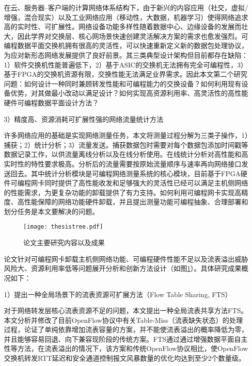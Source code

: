 在云、服务器--客户端的计算网络体系结构下，由于新兴的内容应用（社交，虚拟/增强，混合现实）以及工业网络应用（移动性，大数据，机器学习）使得网络追求高的实时性、可扩展性。网络设备功能多样性随着数据中心、边缘设备的发展而壮大，因此学界对交换层、核心网场景快速创建灵活解决方案的需求也愈发强烈。可编程数据平面交换机拥有很高的灵活性，可以快速重新定义新的数据包处理协议，为应对新形态网络发展提供了良好前景。其三类典型设计架构但目前都存在缺陷：1）软件交换机性能普遍低下，2）基于ASIC的交换机无法拥有完全可编程性，3）基于FPGA的交换机资源有限，交换性能无法满足业界需求。因此本文第二个研究问题：如何设计一种同时兼顾转发性能和可编程能力的交换设备？如何利用现有设备优势，对其做最小改动以满足设计？如何实现高资源利用率、高灵活性的高性能硬件可编程数据平面设计方法？

3）精度高、资源消耗可扩展性强的网络流量统计方法

许多网络应用的基础是实现网络测量任务，本文将测量过程分解为三类子操作，1）捕获；2）统计分析；3）流量发送。捕获数据包时需要对每个数据包添加时间戳等数据记录工作，以供流量离线分析以及在线分析使用。在线统计分析对高性能和高实时性的特性要求极高。分析后的流量需要按原始流量顺序与速率再向网络接口发送回去。其中统计分析模块是可编程网络测量系统的核心模块，目前基于FPGA硬件可编程网卡同时提供了高性能收发和足够强大的灵活性已经可以满足主机侧网络的性能需求，为更复杂功能的卸载提供了有力支持。如何利用可编程网卡实现高精度、高性能保障的网络功能硬件卸载，并且提出测量功能可编程抽象、合理部署和划分任务是本文要解决的问题。








\label{chap14}
\begin{figure}[!ht]
	\centering 
	\vspace{-1.5mm}
	\texttt{[image: thesistree.pdf]}
	\caption{论文主要研究内容以及成果} \label{fig:thesistree}
\end{figure}

论文针对可编程网卡卸载主机侧网络功能、可编程硬件性能不足以及流表溢出威胁风险大、资源利用率低等问题展开分析和创新方法设计（如图\ref{fig:thesistree}）。具体研究成果概况如下：

1）提出一种全局场景下的流表资源可扩展方法（Flow Table Sharing, FTS）

对于网络转发层核心流表资源不足的问题，本文提出一种全局流表共享方法FTS。本文分析并修改了目前OpenFlow协议中有关Table-Miss（流表缺失状态）的处理过程，论证了单纯依靠增加流表容量的方案，并不能使流表溢出的概率降低为零，并且能够容易回退、向下兼容现阶段的传统方案。FTS通过通过增强数据平面自主性等方法，在流表溢出的情况下，该方案和传统OpenFlow协议相比，使OpenFlow交换机转发RTT延迟和安全通道控制报文风暴数量的优化均达到至少2个数量级。


